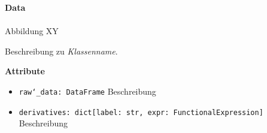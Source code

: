 \documentclass{article}
\begin{document}
\newpage
\textbf{\large{Data}}\\\\
Abbildung XY

Beschreibung zu \textit{Klassenname}.
\newline \newline

\textbf{{Attribute}}
\begin{itemize}
\item \texttt{raw\char`_data: DataFrame} \newline Beschreibung
\item \texttt{derivatives: dict[label: str, expr: FunctionalExpression]} \newline Beschreibung
\\\\
\end{itemize}
\end{document}
